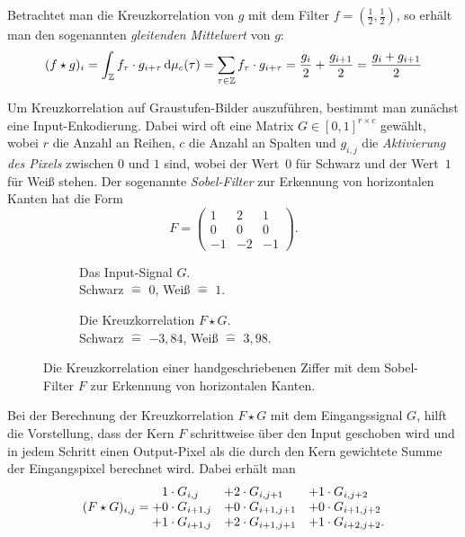\documentclass{article}
\theoremstyle{definition}
\newcommand{\Z}{\mathbb{Z}}
\newcommand{\diff}{\,\textrm{d}}
\begin{document}
Betrachtet man die Kreuzkorrelation von $g$ mit dem Filter $f=(\frac{1}{2}, \frac{1}{2})$, so erhält man den sogenannten \emph{gleitenden Mittelwert} von $g$:
\[  
    (f \star g)_i = \int_\Z f_\tau \cdot g_{i + \tau} \diff \cmeasure(\tau) 
    = \sum_{\tau\in\Z} f_\tau \cdot g_{i+ \tau}
    = \frac{g_i}{2} + \frac{g_{i+1}}{2} = \frac{g_i + g_{i+1}}{2}
\]

Um Kreuzkorrelation auf Graustufen-Bilder auszuführen, bestimmt man zu\-nächst eine Input-Enkodierung.
Dabei wird oft eine Matrix $G\in[0,1]^{r\times c}$ gewählt, wobei $r$ die Anzahl an Reihen, $c$ die Anzahl an Spalten und $g_{i,j}$ die \emph{Aktivierung des Pixels} zwischen $0$ und $1$ sind, wobei der Wert~$0$ für Schwarz und der Wert~$1$ für Weiß stehen.
Der sogenannte \emph{Sobel-Filter} zur Erkennung von horizontalen Kanten hat die Form
\[
    F = \begin{pmatrix}
        1 & 2 & 1 \\
        0 & 0 & 0 \\ 
        -1 & -2 & -1
    \end{pmatrix}.
\]


\begin{figure}
    \begin{subfigure}{0.5\textwidth}
        \resizebox{\textwidth}{\textwidth}{
        
        }
        \captionsetup{justification=centering}
        \caption{Das Input-Signal $G$.\\Schwarz $\hat=$ $0$, Weiß $\hat=$ $1$.}
    \end{subfigure}%
    \begin{subfigure}{0.5\textwidth}
        \resizebox{0.9285\textwidth}{0.9285\textwidth}{
        
        }
    \captionsetup{justification=centering}
    \caption{Die Kreuzkorrelation $F\star G$.\\Schwarz $\hat=$ $-3{,}84$, Weiß $\hat=$ $3{,}98$.}
    \end{subfigure}
    \caption{Die Kreuzkorrelation einer handgeschriebenen Ziffer mit dem Sobel-Filter $F$ zur Erkennung von horizontalen Kanten.}
    \label{fig:sobel-on-mnist}
\end{figure}

Bei der Berechnung der Kreuzkorrelation $F\star G$ mit dem Eingangssignal $G$, hilft die Vorstellung, dass der Kern $F$ schrittweise über den Input geschoben wird und in jedem Schritt einen Output-Pixel als die durch den Kern gewichtete Summe der Eingangspixel berechnet wird.
Dabei erhält man
\[
(F\star G)_{i,j} = \begin{matrix*}[l]
    \hphantom{+}1\cdot G_{i,j}  & + 2\cdot G_{i, j+1} & + 1\cdot G_{i, j+2} \\
    + 0\cdot G_{i+1, j} &+ 0\cdot G_{i+1, j+1} &+ 0\cdot G_{i+1, j+2} \\
    +1\cdot G_{i+1, j} &+ 2\cdot G_{i+1, j+1} &+ 1\cdot G_{i+2, j+2}.
    \end{matrix*}
\]
\end{document}
